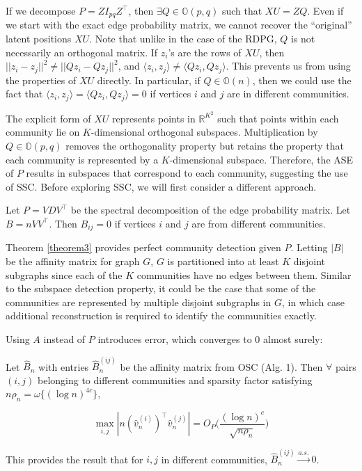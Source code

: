 \documentclass[12pt]{article}
\begin{document}
If we decompose \(P = Z I_{pq} Z^\top\), then
\(\exists Q \in \mathbb{O}(p, q)\) such that \(XU = Z Q\). Even if we
start with the exact edge probability matrix, we cannot recover the
``original'' latent positions \(XU\). Note that unlike in the case of
the RDPG, \(Q\) is not necessarily an orthogonal matrix. If \(z_i\)'s
are the rows of \(XU\), then
\(||z_i - z_j||^2 \neq ||Q z_i - Q z_j||^2\), and
\(\langle z_i, z_j \rangle \neq \langle Q z_i, Q z_j \rangle\). This
prevents us from using the properties of \(XU\) directly. In particular,
if \(Q \in \mathbb{O}(n)\), then we could use the fact that
\(\langle z_i, z_j \rangle = \langle Q z_i, Q z_j \rangle = 0\) if
vertices \(i\) and \(j\) are in different communities.

The explicit form of \(XU\) represents points in \(\mathbb{R}^{K^2}\)
such that points within each community lie on \(K\)-dimensional
orthogonal subspaces. Multiplication by \(Q \in \mathbb{O}(p, q)\)
removes the orthogonality property but retains the property that each
community is represented by a \(K\)-dimensional subspace. Therefore, the
ASE of \(P\) results in subspaces that correspond to each community,
suggesting the use of SSC. Before exploring SSC, we will first consider
a different approach.

\begin{theorem}
\label{theorem3}
Let $P = V D V^\top$ be the spectral decomposition of the edge probability
matrix. Let $B = n V V^\top$. Then $B_{ij} = 0$ if vertices $i$ and $j$ are 
from different communities.
\end{theorem}

Theorem \ref{theorem3} provides perfect community detection given \(P\).
Letting \(|B|\) be the affinity matrix for graph \(G\), \(G\) is
partitioned into at least \(K\) disjoint subgraphs since each of the
\(K\) communities have no edges between them. Similar to the subspace
detection property, it could be the case that some of the communities
are represented by multiple disjoint subgraphs in \(G\), in which case
additional reconstruction is required to identify the communities
exactly.

Using \(A\) instead of \(P\) introduces error, which converges to \(0\)
almost surely:

\begin{theorem}
\label{theorem4} 
Let $\hat{B}_n$ with entries $\hat{B}_n^{(ij)}$ be the affinity matrix from OSC 
(Alg. 1). Then $\forall$ pairs $(i, j)$ belonging to different communities 
and sparsity factor satisfying $n \rho_n = \omega\{(\log n)^{4c}\}$, 

\begin{equation} \label{eq:thm4}
\max_{i, j} |n (\hat{v}_n^{(i)})^\top \hat{v}_n^{(j)}| = 
O_P \Big( \frac{(\log n)^c}{\sqrt{n \rho_n}} \Big)
\end{equation}

This provides the result that for $i, j$ in different communities, 
$\hat{B}_n^{(ij)} \stackrel{a.s.}{\to} 0$.
\end{theorem}
\end{document}
